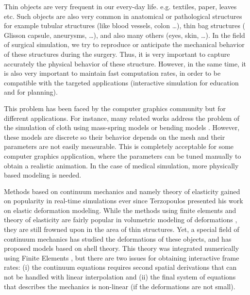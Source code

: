 \documentclass{egpubl}
\begin{document}
Thin objects are very frequent in our every-day life. %
e.g. textiles, paper, leaves etc. 
Such objects are also very common in anatomical or pathological structures for example tubular structures (like blood vessels, colon \ldots), thin bag structures (%
Glisson capsule, aneurysms,  \ldots), and also many others (eyes, skin, \ldots). 
In the field of surgical simulation, we try to reproduce or anticipate the mechanical behavior of these structures during the surgery.
Thus, it is very important to capture accurately the physical behavior of these structure.
However, in the same time, it is also very important to maintain fast computation rates, in order to be compatible with the targeted applications (interactive simulation for education and for planning).

This problem has been faced by the computer graphics community but for different applications.
For instance, many related works address the problem of the simulation of cloth using mass-spring models \cite{Volino2009} or bending models \cite{Grinspun2003}. %
However, these models are discrete so their behavior depends on the mesh and their parameters are not easily measurable.
This is completely acceptable for some computer graphics application, where the parameters can be tuned manually to obtain a realistic animation.
In the case of medical simulation, more physically based modeling is needed.


Methods based on continuum mechanics and namely theory of elasticity gained on popularity in real-time simulations ever since Terzopoulos \cite{Terzopoulos1987} presented his work on elastic deformation modeling.
While the methods using finite elements and theory of elasticity are fairly popular in volumetric modeling of deformations \cite{Cotin1999,Nesme2006,Miller2007}, they are still frowned upon in the area of thin structures. 
Yet, a special field of continuum mechanics has studied the deformations of these objects, and has proposed models based on shell theory.
This theory was integrated numerically using Finite Elements \cite{Reddy1993}, but there are two issues for obtaining interactive frame rates: 
(i) the continuum equations requires second spatial derivations that can not be handled with linear interpolation and 
(ii) the final system of equations that describes the mechanics is non-linear (if the deformations are not small).
\end{document}
